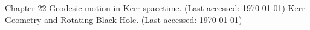 \documentclass[a4paper,pdftex,10pt]{article}
\begin{document}
\clearpage
\begin{thebibliography}{99}
  \href{https://www.roma1.infn.it/teongrav/onde19_20/geodetiche_Kerr.pdf}{Chapter 22 Geodesic motion in Kerr spacetime}. (Last accessed: \today)
  \href{https://www.pas.rochester.edu/assets/pdf/undergraduate/kerr_geometry_and_rotating_black_holes.pdf}{Kerr Geometry and Rotating Black Hole}. (Last accessed: \today)
\end{thebibliography}












% 
% 

\end{document}
